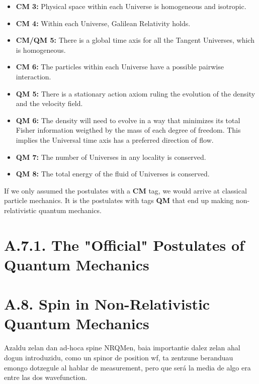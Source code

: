 \documentclass[11pt, a4paper]{article} %
\begin{document}
\begin{itemize}
\item {\bf CM 3:} Physical space within each Universe is homogeneous and isotropic.

\item {\bf CM 4:} Within each Universe, Galilean Relativity holds.

\item {\bf CM/QM 5:} There is a global time axis for all the Tangent Universes, which is homogeneous.

\item {\bf CM 6:} The particles within each Universe have a possible pairwise interaction.

\item {\bf QM 5:} There is a stationary action axiom ruling the evolution of the density and the velocity field.

\item {\bf QM 6:} The density will need to evolve in a way that minimizes its total Fisher information weigthed by the mass of each degree of freedom. This implies the Universal time axis has a preferred direction of flow.

\item {\bf QM 7:} The number of Universes in any locality is conserved.

\item {\bf QM 8:} The total energy of the fluid of Universes is conserved.

\end{itemize}
If we only assumed the postulates with a {\bf CM} tag, we would arrive at classical particle mechanics. It is the postulates with tags {\bf QM} that end up making non-relativistic quantum mechanics.

\section*{A.7.1. The "Official" Postulates of Quantum Mechanics}

\newpage

\section*{A.8. Spin in Non-Relativistic Quantum Mechanics}
\iffalse
Azaldu zelan dan ad-hoca spine NRQMen, baia importantie dalez zelan ahal dogun introduzidu, como un spinor de position wf, ta zentzune beranduau emongo dotzegule al hablar de measurement, pero que será la media de algo era entre las dos wavefunction.
\end{document}
